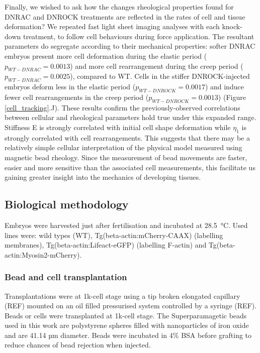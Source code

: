 Finally, we wished to ask how the changes rheological properties found for DNRAC and DNROCK treatments are reflected in the rates of cell and tissue deformation?
We repeated fast light sheet imaging analyses with each knock-down treatment, to follow cell behaviours during force application.
The resultant parameters do segregate according to their mechanical properties: softer DNRAC embryos present more cell deformation during the elastic period ($p_{WT-DNRAC} = 0.0013$) and more cell rearrangement during the creep period ($p_{WT-DNRAC} = 0.0025$), compared to WT.
Cells in the stiffer DNROCK-injected embryos deform less in the elastic period ($p_{WT-DNROCK} = 0.0017$) and induce fewer cell rearrangements in the creep period ($p_{WT-DNROCK} = 0.0013$) (Figure \ref{cell_tracking}.J).
These results confirm the previously-observed correlations between cellular and rheological parameters hold true under this expanded range.
Stiffness E is strongly correlated with initial cell shape deformation while $\eta_1$ is strongly correlated with cell rearrangements.
This suggests that there may be a relatively simple cellular interpretation of the physical model measured using magnetic bead rheology.
Since the measurement of bead movements are faster, easier and more sensitive than the associated cell measurements, this facilitate us gaining greater insight into the mechanics of developing tissues.

\subsection{Biological methodology}
Embryos were harvested just after fertilisation and incubated at \SI{28.5}{\celsius}.
Used lines were: wild types (WT), Tg(beta-actin:mCherry-CAAX) (labelling membranes), Tg(beta-actin:Lifeact-eGFP) (labelling F-actin) and Tg(beta-actin:Myosin2-mCherry).

\subsubsection{Bead and cell transplantation}
Transplantations were at 1k-cell stage using a tip broken elongated capillary (REF) mounted on an oil filled pressurised system controlled by a syringe (REF).
Beads or cells were transplanted at 1k-cell stage.
The Superparamagetic beads used in this work are polystyrene spheres filled with nanoparticles of iron oxide and are 41.14 µm diameter.
Beads were incubated in 4\% BSA before grafting to reduce chances of bead rejection when injected.

